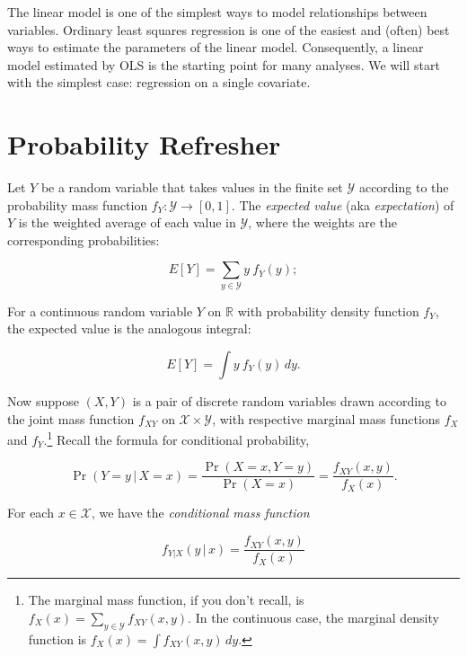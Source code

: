 \documentclass[12pt,oneside,openany]{book}
\let\rmarkdownfootnote\footnote%
\def\footnote{\protect\rmarkdownfootnote}
\begin{document}
The linear model is one of the simplest ways to model relationships
between variables. Ordinary least squares regression is one of the
easiest and (often) best ways to estimate the parameters of the linear
model. Consequently, a linear model estimated by OLS is the starting
point for many analyses. We will start with the simplest case:
regression on a single covariate.

\section{Probability Refresher}\label{probability-refresher}

Let \(Y\) be a random variable that takes values in the finite set
\(\mathcal{Y}\) according to the probability mass function
\(f_Y : \mathcal{Y} \to [0, 1]\). The \emph{expected value} (aka
\emph{expectation}) of \(Y\) is the weighted average of each value in
\(\mathcal{Y}\), where the weights are the corresponding probabilities:

\begin{equation}
E[Y] = \sum_{y \in \mathcal{Y}} y \: f_Y(y);
\end{equation}

For a continuous random variable \(Y\) on \(\mathbb{R}\) with
probability density function \(f_Y\), the expected value is the
analogous integral:

\begin{equation}
E[Y] = \int y \: f_Y(y) \, dy.
\end{equation}

Now suppose \((X, Y)\) is a pair of discrete random variables drawn
according to the joint mass function \(f_{XY}\) on
\(\mathcal{X} \times \mathcal{Y}\), with respective marginal mass
functions \(f_X\) and \(f_Y\).\footnote{The marginal mass function, if
  you don't recall, is
  \(f_X(x) = \sum_{y \in \mathcal{Y}} f_{XY} (x, y)\). In the continuous
  case, the marginal density function is
  \(f_X(x) = \int f_{XY} (x, y) \, dy\).} Recall the formula for
conditional probability,

\begin{equation}
\Pr(Y = y \,|\, X = x)
= \frac{\Pr(X = x, Y = y)}{\Pr(X = x)}
= \frac{f_{XY}(x, y)}{f_X(x)}.
\end{equation}

For each \(x \in \mathcal{X}\), we have the \emph{conditional mass
function}

\begin{equation}
f_{Y|X}(y \,|\, x) = \frac{f_{XY}(x, y)}{f_X(x)}
\end{equation}
\end{document}
